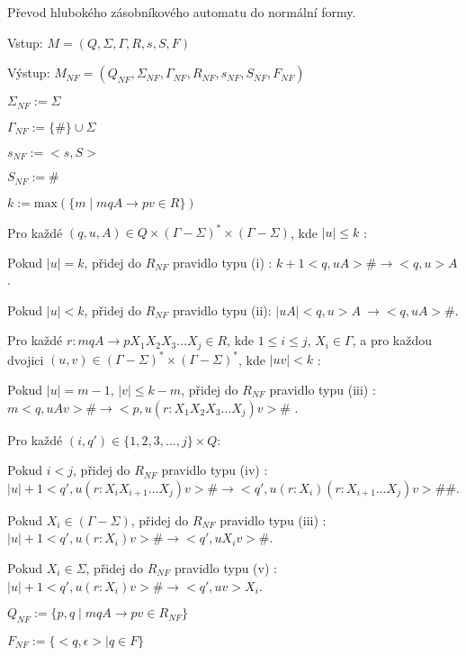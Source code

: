 \begin{Alg}
Převod hlubokého zásobníkového automatu do normální formy.

\begin{list}{}{\setlength\parsep{0cm} \setlength\itemsep{0cm} \setlength\leftmargin{1em}}
   \item Vstup: $M = (Q,\Sigma,\Gamma, R, s, S, F)$ 
   \item Výstup: $M_{NF} = (Q_{NF}, \Sigma_{NF}, {\Gamma}_{NF}, R_{NF}, s_{NF},  S_{NF}, F_{NF})$ \medskip
  
  \item ${\Sigma}_{NF} := \Sigma$
  \item ${\Gamma}_{NF} :=\{\#\} \cup \Sigma$
  \item $s_{NF} := <s,S>$
  \item $S_{NF} := \#$ \medskip

  \item $k := \mathrm{max}(\{m \mid mqA \rightarrow pv \in R\}) $ \medskip

  \item Pro každé $(q,u,A) \in Q \times (\Gamma - \Sigma)^* \times (\Gamma - \Sigma)$, kde $|u| \le k$ : \medskip

  \subitem Pokud $|u| = k$, přidej do $R_{NF}$ pravidlo typu (i) :
  \subitem $k+1 <q,uA> \# \rightarrow <q,u> A$. \medskip

  \subitem Pokud $|u| < k$, přidej do $R_{NF}$ pravidlo typu (ii):
  \subitem $|uA| <q,u> A~\rightarrow <q,uA> \#$. \medskip

  \item Pro každé $r : mqA \rightarrow p X_1 X_2 X_3 \dots X_j \in R$, kde $1 \le i \le j$, $X_i \in \Gamma$, a 
        pro každou dvojici $(u,v) \in (\Gamma - \Sigma)^* \times (\Gamma - \Sigma)^*$, kde $|uv| < k$ : \medskip

  \subitem Pokud $|u| = m - 1$, $|v| \le k-m$, přidej do $R_{NF}$ pravidlo typu (iii) :
  \subitem $m <q,uAv> \# \rightarrow <p,u (r : X_1 X_2 X_3 \dots X_j) v>\#$ . \medskip

  \subitem Pro každé $(i,q') \in \{1,2,3,\dots,j\} \times Q$: \medskip

  \subsubitem Pokud $i < j$, přidej do $R_{NF}$ pravidlo typu (iv) :
  \subsubitem $|u|+1 <q',u(r : X_i X_{i+1} \dots X_j)v> \# \rightarrow <q',u(r : X_i) (r: X_{i+1} \dots X_j)v> \#\# $. \medskip

  \subsubitem Pokud $X_i \in (\Gamma - \Sigma)$, přidej do $R_{NF}$ pravidlo typu (iii) :
  \subsubitem $|u|+1 <q',u (r : X_i) v> \# \rightarrow <q',u X_i v> \# $. \medskip

  \subsubitem Pokud $X_i \in \Sigma$, přidej do $R_{NF}$ pravidlo typu (v) :
  \subsubitem $|u|+1 <q',u (r : X_i) v> \# \rightarrow <q',uv> X_i $. \bigskip

  \item $Q_{NF} := \{p,q \mid mqA \rightarrow pv \in R_{NF}\} $
  \item $F_{NF} := \{<q, \epsilon> \mid  q \in F \}$


\end{list}
\end{Alg}


